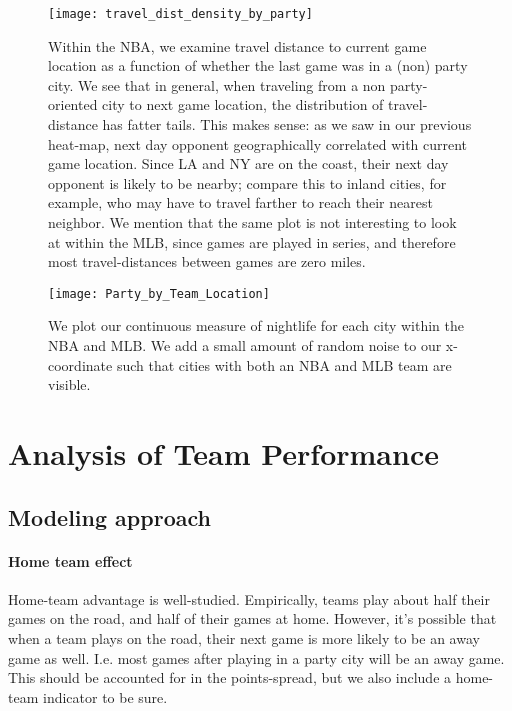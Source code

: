 \documentclass[letterpaper,12pt]{article}
\begin{document}
\begin{figure}
  \centering
  \texttt{[image: travel\_dist\_density\_by\_party]}
  \label{fig: density by party}
  \caption{Within the NBA, we examine travel distance to current game location as a function of
    whether the last game was in a (non) party city. We see that in general,
    when traveling from a non party-oriented city to next game location, the distribution
    of travel-distance has fatter tails. This makes sense: as we saw in our previous
    heat-map, next day opponent geographically correlated with current game location.
    Since LA and NY are on the coast, their next day opponent is likely to be nearby; compare
    this to inland cities, for example, who may have to travel farther to reach their 
    nearest neighbor. We mention that the same     plot is not interesting to look at within the MLB, since games are played in     series, and therefore most travel-distances between games are zero miles.}
\end{figure}


\begin{figure}
  \centering
  \label{fig: party by team loc}
  \texttt{[image: Party\_by\_Team\_Location]}
  \caption{We plot our continuous measure of nightlife for each city within the NBA and MLB. We add a small amount of random noise to our x-coordinate such that cities
with both an NBA and MLB team are visible.}
\end{figure}



\section{Analysis of Team Performance}

\subsection{Modeling approach}

\paragraph{Home team effect}
Home-team advantage is well-studied.\citep{jones07, jones08}  
Empirically, teams play about half their games on the road, and half of their games at home. However,
it's possible that when a team plays on the road, their next game is more likely to be
an away game as well. I.e. most games after playing in a party city will be an away game.
This should be accounted for in the points-spread, but we also include
a home-team indicator to be sure.
\end{document}
